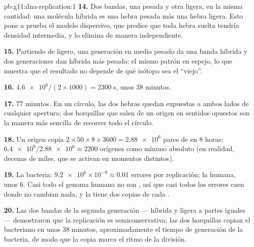 \begin{solution}{pb:g11:dna-replication:1}
\textbf{14.} Dos bandas, una pesada y otra ligera, en la misma
cantidad: una molécula híbrida es una hebra pesada más una hebra
ligera. Esto pone a prueba el modelo dispersivo, que predice que toda
hebra suelta tendría densidad intermedia, y lo elimina de manera
independiente.

\textbf{15.} Partiendo de ligero, una generación en medio pesado da una
banda híbrida y dos generaciones dan híbrida más pesada: el mismo
patrón en espejo, lo que muestra que el resultado no depende de qué
isótopo sea el ``viejo''.

\textbf{16.} $\num{4.6e6}/(2 \times 1000) = \qty{2300}{s}$, unos 38
minutos.

\textbf{17.} 77 minutos. En un círculo, las dos hebras quedan expuestas
a ambos lados de cualquier apertura; dos horquillas que salen de un
origen en sentidos opuestos son la manera más sencilla de recorrer todo
el círculo.

\textbf{18.} Un origen copia $2 \times 50 \times 8 \times 3600 =
\num{2.88e6}$ pares de  en 8 horas; $\num{6.4e9}/\num{2.88e6}
\approx 2200$ orígenes como mínimo absoluto (en realidad, decenas de
miles, que se activan en momentos distintos).

\textbf{19.} La bacteria: $\num{9.2e6} \times 10^{-9} \approx 0.01$
errores por replicación; la  humana, unos 6. Casi todo el genoma
humano no son , así que casi todos los errores caen donde no
cambian nada, y la  tiene dos copias de cada .

\textbf{20.} Las dos bandas de la segunda generación --- híbrida y
ligera a partes iguales --- demostraron que la replicación es
semiconservativa; las dos horquillas copian el  bacteriano en
unos 38 minutos, aproximadamente el tiempo de generación de la
bacteria, de modo que la copia marca el ritmo de la división.
\end{solution}
